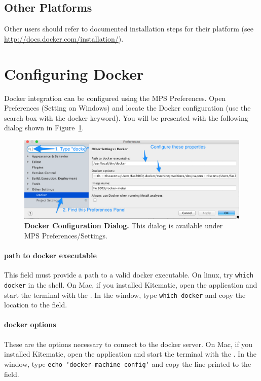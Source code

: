 \subsection{Other Platforms}
 Other users should refer to documented installation steps for their platform (see \url{http://docs.docker.com/installation/}).

\section{Configuring Docker}
Docker integration can be configured using the MPS Preferences.  Open Preferences (Setting on Windows) and locate the Docker configuration (use the search box with the docker keyword). You will be presented with the following dialog shown in Figure~\ref{fig:DockerPreferencesDialog}.

\begin{figure}[h!tbp]
  \centering
  \includegraphics[width=\figWidthWide]{figures/DockerPreferencesDialog.png}
\caption[Docker Configuration Dialog.]{\textbf{Docker Configuration Dialog.} This dialog is available under MPS Preferences/Settings.}
\label{fig:DockerPreferencesDialog}
\end{figure}

\paragraph{path to docker executable}
This field must provide a path to a valid docker executable. On linux, try \texttt{which docker} in the shell. On Mac, if you installed Kitematic, open the application and start the terminal with the \allowbreak{}. In the window, type \texttt{which docker} and copy the location to the field. 

\paragraph{docker options}
These are the options necessary to connect to the docker server. On Mac, if you installed Kitematic, open the application and start the terminal with the \allowbreak{}. In the window, type \texttt{echo `docker-machine config`} and copy the line printed to the field. 

